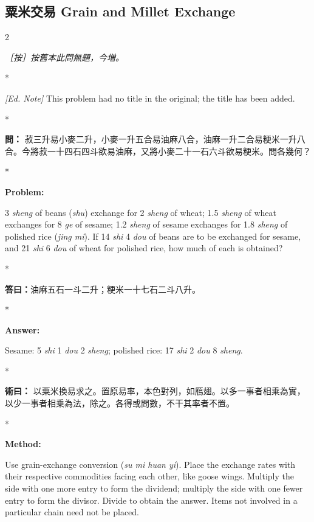\documentclass[11pt,a4paper]{article}
\newcommand{\CnQuestion}[1]{\par\noindent\textbf{\color{problemcolor}問：}#1\par\vspace{0.5ex}}
\newcommand{\CnAnswer}[1]{\par\noindent\textbf{\color{answercolor}答曰：}#1\par\vspace{0.5ex}}
\newcommand{\CnMethod}[1]{\par\noindent\textbf{\color{methodcolor}術曰：}#1\par\vspace{0.5ex}}
\newcommand{\CnEditorial}[1]{\par\noindent\textcolor{editorialcolor}{\textit{［按］#1}}\par\vspace{0.5ex}}
\newcommand{\EnQuestion}{\par\noindent\textbf{\color{problemcolor}Problem:}\par\vspace{0.5ex}}
\newcommand{\EnAnswer}{\par\noindent\textbf{\color{answercolor}Answer:}\par\vspace{0.5ex}}
\newcommand{\EnMethod}{\par\noindent\textbf{\color{methodcolor}Method:}\par\vspace{0.5ex}}
\newcommand{\EnEditorial}{\par\noindent\textcolor{editorialcolor}{\textit{[Ed. Note] }}\ignorespaces}
\newcommand{\switchCn}{\switchcolumn[0]*}
\newcommand{\switchEn}{\switchcolumn[1]*}
\begin{document}
\vspace{1.5em}

\subsection*{粟米交易 \quad Grain and Millet Exchange}

\begin{paracol}{2}

\CnEditorial{按舊本此問無題，今増。}

\switchEn

\EnEditorial This problem had no title in the original; the title has been added.

\switchCn

\CnQuestion{%
菽三升易小麥二升，小麥一升五合易油麻八合，油麻一升二合易粳米一升八合。今將菽一十四石四斗欲易油麻，又將小麥二十一石六斗欲易粳米。問各幾何？
}

\switchEn

\EnQuestion
3 \textit{sheng} of beans (\textit{shu}) exchange for 2 \textit{sheng} of wheat; 1.5 \textit{sheng} of wheat exchanges for 8 \textit{ge} of sesame; 1.2 \textit{sheng} of sesame exchanges for 1.8 \textit{sheng} of polished rice (\textit{jing mi}). If 14 \textit{shi} 4 \textit{dou} of beans are to be exchanged for sesame, and 21 \textit{shi} 6 \textit{dou} of wheat for polished rice, how much of each is obtained?

\switchCn

\CnAnswer{油麻五石一斗二升；粳米一十七石二斗八升。}

\switchEn

\EnAnswer Sesame: 5 \textit{shi} 1 \textit{dou} 2 \textit{sheng}; polished rice: 17 \textit{shi} 2 \textit{dou} 8 \textit{sheng}.

\switchCn

\CnMethod{%
以粟米換易求之。置原易率，本色對列，如鴈翅。以多一事者相乘為實，以少一事者相乗為法，除之。各得或問數，不干其率者不置。
}

\switchEn

\EnMethod
Use grain-exchange conversion (\textit{su mi huan yi}). Place the exchange rates with their respective commodities facing each other, like goose wings. Multiply the side with one more entry to form the dividend; multiply the side with one fewer entry to form the divisor. Divide to obtain the answer. Items not involved in a particular chain need not be placed.


\end{paracol}
\end{document}
